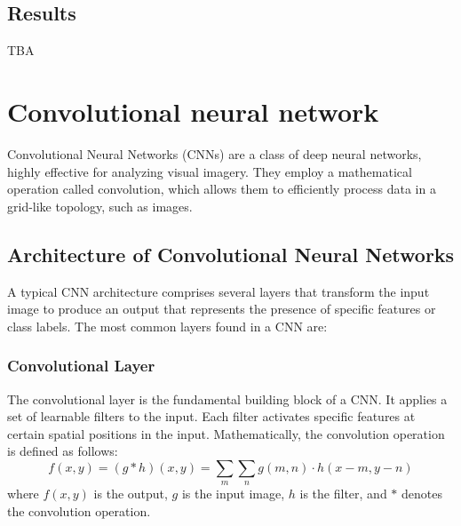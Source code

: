 \subsection{Results}
TBA





























\section{Convolutional neural network}
Convolutional Neural Networks (CNNs) \cite{convolutional_neural_network} are a class of deep neural networks, highly effective for analyzing visual imagery. They employ a mathematical operation called convolution, which allows them to efficiently process data in a grid-like topology, such as images.

\subsection{Architecture of Convolutional Neural Networks}
A typical CNN architecture comprises several layers that transform the input image to produce an output that represents the presence of specific features or class labels. The most common layers found in a CNN are:

\subsubsection{Convolutional Layer}
The convolutional layer is the fundamental building block of a CNN. It applies a set of learnable filters to the input. Each filter activates specific features at certain spatial positions in the input. Mathematically, the convolution operation is defined as follows:
\[f(x, y) = (g * h)(x, y) = \sum_m\sum_n g(m,n) \cdot h(x-m, y-n)\]
where \(f(x, y)\) is the output, \(g\) is the input image, \(h\) is the filter, and \(*\) denotes the convolution operation.

